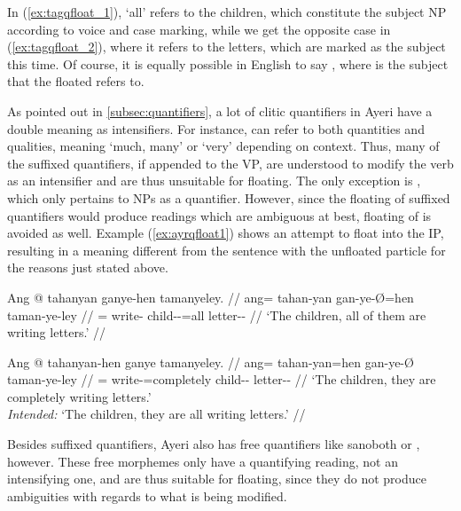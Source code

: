 \xe

In (\ref{ex:tagqfloat_1}),  `all' refers to the children, which
constitute the subject NP according to voice and case marking, while we get the
opposite case in (\ref{ex:tagqfloat_2}), where it refers to the letters, which
are marked as the subject this time. Of course, it is equally possible in
English to say , where  is the subject that the floated  refers to.

As pointed out in \autoref{subsec:quantifiers}, a lot of clitic quantifiers in
Ayeri have a double meaning as intensifiers. For instance, 
can refer to both quantities and qualities, meaning `much, many' or `very'
depending on context. Thus, many of the suffixed quantifiers, if appended to
the VP, are understood to modify the verb as an intensifier and are thus
unsuitable for floating. The only exception is ,
which only pertains to NPs as a quantifier. However, since the floating of
suffixed quantifiers would produce readings which are ambiguous at best,
floating of  is avoided as well. Example
(\ref{ex:ayrqfloat1}) shows an attempt to float  into
the IP, resulting in a meaning different from the sentence with the unfloated
particle for the reasons just stated above.

\pex\label{ex:ayrqfloat1}
\a\label{ex:ayrqfloat1_1}\begingl
	\gla Ang @ tahanyan ganye-hen tamanyeley. //
	\glb ang= tahan-yan gan-ye-Ø=hen taman-ye-ley //
	\glc \AgtT{}= write-\TplM{} child-\Pl{}-\Top{}=all letter-\Pl{}-\PargI{} //
	\glft `The children, all of them are writing letters.' //
\endgl

\a\label{ex:ayrqfloat1_2}\ljudge\excl\begingl
	\gla Ang @ tahanyan-hen ganye tamanyeley. //
	\glb ang= tahan-yan=hen gan-ye-Ø taman-ye-ley //
	\glc \AgtT{}= write-\TplM{}=completely child-\Pl{}-\Top{}
		letter-\Pl{}-\PargI{} //
	\glft `The children, they are completely writing letters.'\\
		\textit{Intended:} `The children, they are all writing letters.' //
\endgl

\xe

Besides suffixed quantifiers, Ayeri also has free quantifiers like 
{sano}{both} or , however. These free morphemes
only have a quantifying reading, not an intensifying one, and are thus suitable
for floating, since they do not produce ambiguities with regards to
what is being modified.


